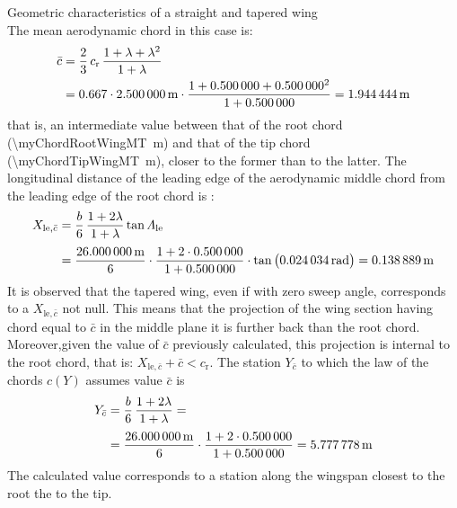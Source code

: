 \documentclass[[12pt,twoside]{book}
\begin{document}
\begin{myExampleX}{Geometric characteristics of a straight and tapered wing}{}
\[\]
The mean aerodynamic chord in this case is:
\[
\begin{split}
\bar{c} & {}= \frac{2}{3} \, c_\mathrm{r} \, \frac{1+\lambda + \lambda^2}{1+\lambda} \\
  & {}=
    \num{0.667} \cdot \SI[round-precision=2]{\myChordRootWingMT}{\metre}
      \cdot 
        \frac{
          1 + \SI[round-precision=2]{\myTaperRatioWing}{} + \SI[round-precision=2]{\myTaperRatioWing}{}^2
        }{
          1 + \SI[round-precision=2]{\myTaperRatioWing}{}
        }
    =  \SI[round-precision=2]{\myMACWingMT}{\metre} 
\end{split}
\]
that is, an intermediate value between that of the root chord (\SI[round-precision=2]{\myChordRootWingMT}{\metre}) 
and that of the tip chord (\SI[round-precision=2]{\myChordTipWingMT}{\metre}),
closer to the former than to the latter.
The longitudinal distance of the leading edge of the aerodynamic middle chord from the leading edge of the root chord is :
\[
\begin{split}
X_{\mathrm{le},\bar{c}} 
  & {}=
    \frac{b}{6} \, \frac{1+2\lambda}{1+\lambda} \tan\Lambda_\mathrm{le} \\[3pt]
  & {}=
    \frac{\SI[round-precision=1]{\mySpanWingMT}{\metre}}{6}
      \cdot 
      \frac{
        1 + 2\cdot\SI[round-precision=2]{\myTaperRatioWing}{}
      }{
        1 + \SI[round-precision=2]{\myTaperRatioWing}{}
      }
      \cdot \tan \big( \SI[round-precision=3]{\myLambdaLERad}{\radian} \big)
    =  \SI[round-precision=2]{\myXLEMACWingMT}{\metre} %
\end{split}
\]
It is observed that the tapered wing, even if with zero sweep angle, corresponds to a $X_{\mathrm{le},\bar{c}}$ not null. This means that the projection of the wing section having chord equal to $\bar{c}$ in the middle plane it is further back than the root chord. Moreover,given the value of $\bar{c}$ previously calculated, this projection is internal to the root chord, that is:
$X_{\mathrm{le},\bar{c}}+\bar{c}<c_\mathrm{r}$.
The  station $Y_{\bar{c}}$ to which the law of the chords $c(Y)$ assumes value $\bar{c}$ is
\[
\begin{split}
Y_{\bar{c}} 
  & {}=
    \frac{b}{6} \, \frac{1+2\lambda}{1+\lambda} = \\[3pt]
  & {}=
    \frac{\SI[round-precision=1]{\mySpanWingMT}{\metre}}{6}
      \cdot 
      \frac{
        1 + 2\cdot\SI[round-precision=2]{\myTaperRatioWing}{}
      }{
        1 + \SI[round-precision=2]{\myTaperRatioWing}{}
      }
    =  \SI[round-precision=2]{\myYMACWingMT}{\metre} 
\end{split}
\]
The calculated value corresponds to a station along the wingspan closest to the root the to the tip.
\end{myExampleX}
\end{document}
